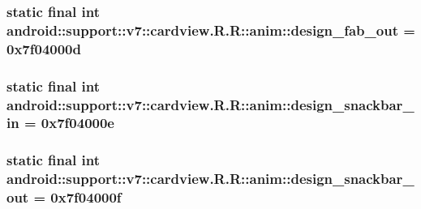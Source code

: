 \hypertarget{classandroid_1_1support_1_1v7_1_1cardview_1_1_r_1_1anim_53ebbb406eab8418154be36c0e5d87ac}{
\subsubsection[{design\_\-fab\_\-out}]{\setlength{\rightskip}{0pt plus 5cm}static final int android::support::v7::cardview.R.R::anim::design\_\-fab\_\-out = 0x7f04000d}}
\label{classandroid_1_1support_1_1v7_1_1cardview_1_1_r_1_1anim_53ebbb406eab8418154be36c0e5d87ac}


\hypertarget{classandroid_1_1support_1_1v7_1_1cardview_1_1_r_1_1anim_55b42aafa3d3fb803d42d0cb87f0d392}{
\subsubsection[{design\_\-snackbar\_\-in}]{\setlength{\rightskip}{0pt plus 5cm}static final int android::support::v7::cardview.R.R::anim::design\_\-snackbar\_\-in = 0x7f04000e}}
\label{classandroid_1_1support_1_1v7_1_1cardview_1_1_r_1_1anim_55b42aafa3d3fb803d42d0cb87f0d392}


\hypertarget{classandroid_1_1support_1_1v7_1_1cardview_1_1_r_1_1anim_b7293e0e2c8d1950e53e8ae1403dfd7f}{
\subsubsection[{design\_\-snackbar\_\-out}]{\setlength{\rightskip}{0pt plus 5cm}static final int android::support::v7::cardview.R.R::anim::design\_\-snackbar\_\-out = 0x7f04000f}}
\label{classandroid_1_1support_1_1v7_1_1cardview_1_1_r_1_1anim_b7293e0e2c8d1950e53e8ae1403dfd7f}




